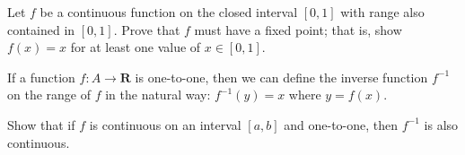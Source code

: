 \begin{exercise}
  Let $f$ be a continuous function on the closed interval $[0,1]$ with range also contained in $[0,1]$. Prove that $f$ must have a fixed point; that is, show $f(x)=x$ for at least one value of $x \in[0,1]$.
\end{exercise}
\begin{solution}
  \TODO
\end{solution}

\begin{exercise}
  If a function $f: A \rightarrow \mathbf{R}$ is one-to-one, then we can define the inverse function $f^{-1}$ on the range of $f$ in the natural way: $f^{-1}(y)=x$ where $y=f(x)$.

  Show that if $f$ is continuous on an interval $[a, b]$ and one-to-one, then $f^{-1}$ is also continuous.
\end{exercise}
\begin{solution}
  \TODO
\end{solution}
